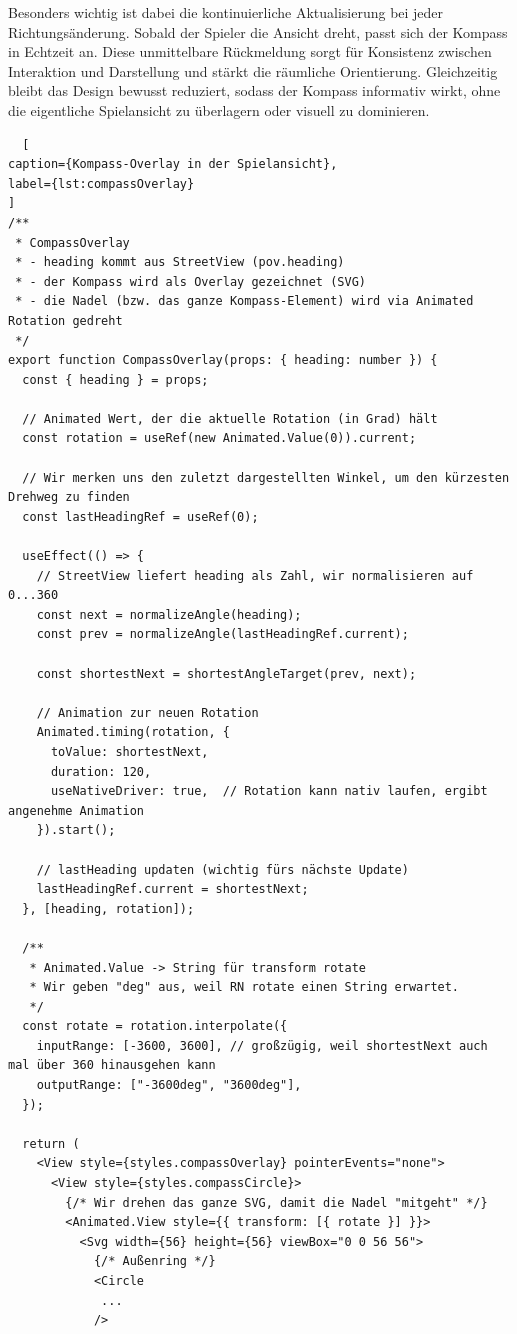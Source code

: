 Besonders wichtig ist dabei die kontinuierliche Aktualisierung bei jeder Richtungsänderung. Sobald der Spieler die Ansicht dreht, passt sich der Kompass in Echtzeit an. Diese unmittelbare Rückmeldung sorgt für Konsistenz zwischen Interaktion und Darstellung und stärkt die räumliche Orientierung. Gleichzeitig bleibt das Design bewusst reduziert, sodass der Kompass informativ wirkt, ohne die eigentliche Spielansicht zu überlagern oder visuell zu dominieren.
\begin{lstlisting}
  [
caption={Kompass-Overlay in der Spielansicht},
label={lst:compassOverlay}
] 
/**
 * CompassOverlay
 * - heading kommt aus StreetView (pov.heading)
 * - der Kompass wird als Overlay gezeichnet (SVG)
 * - die Nadel (bzw. das ganze Kompass-Element) wird via Animated Rotation gedreht
 */
export function CompassOverlay(props: { heading: number }) {
  const { heading } = props;

  // Animated Wert, der die aktuelle Rotation (in Grad) hält
  const rotation = useRef(new Animated.Value(0)).current;

  // Wir merken uns den zuletzt dargestellten Winkel, um den kürzesten Drehweg zu finden
  const lastHeadingRef = useRef(0);

  useEffect(() => {
    // StreetView liefert heading als Zahl, wir normalisieren auf 0...360
    const next = normalizeAngle(heading);
    const prev = normalizeAngle(lastHeadingRef.current);

    const shortestNext = shortestAngleTarget(prev, next);

    // Animation zur neuen Rotation
    Animated.timing(rotation, {
      toValue: shortestNext,
      duration: 120,          
      useNativeDriver: true,  // Rotation kann nativ laufen, ergibt angenehme Animation
    }).start();

    // lastHeading updaten (wichtig fürs nächste Update)
    lastHeadingRef.current = shortestNext;
  }, [heading, rotation]);

  /**
   * Animated.Value -> String für transform rotate
   * Wir geben "deg" aus, weil RN rotate einen String erwartet.
   */
  const rotate = rotation.interpolate({
    inputRange: [-3600, 3600], // großzügig, weil shortestNext auch mal über 360 hinausgehen kann
    outputRange: ["-3600deg", "3600deg"],
  });

  return (
    <View style={styles.compassOverlay} pointerEvents="none">
      <View style={styles.compassCircle}>
        {/* Wir drehen das ganze SVG, damit die Nadel "mitgeht" */}
        <Animated.View style={{ transform: [{ rotate }] }}>
          <Svg width={56} height={56} viewBox="0 0 56 56">
            {/* Außenring */}
            <Circle
             ...
            />


\end{lstlisting}
